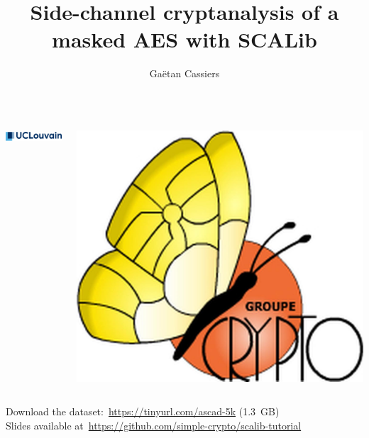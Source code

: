 \documentclass[aspectratio=169]{beamer}
\title{Side-channel cryptanalysis of a masked AES with SCALib}
\author[G. Cassiers]{
    Gaëtan Cassiers
}
\begin{document}
\begin{frame}{}
    \maketitle
    \begin{columns}
        \begin{column}{0.15\textwidth}
            \includegraphics[width=\textwidth]{logos/uclouvain.png}
        \end{column}
        \begin{column}{0.08\textwidth}
            \includegraphics[width=\textwidth]{logos/crypto_group.jpg}
        \end{column}
    \end{columns}
    \vspace*{3ex}
    \begin{center}
        Download the dataset:~\url{https://tinyurl.com/ascad-5k} (1.3~GB) \\
        Slides available at~\url{https://github.com/simple-crypto/scalib-tutorial}
    \end{center}
    \vspace*{2ex}
\end{frame}
\end{document}
